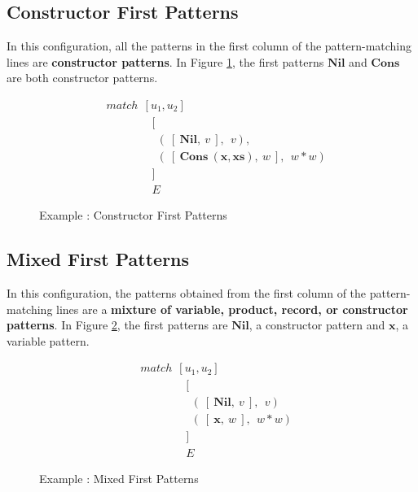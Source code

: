 \documentclass[11pt]{article}
\begin{document}
\subsection{Constructor First Patterns}
  In this configuration, all the patterns in the first column of the pattern-matching lines are {\bf constructor patterns}. In Figure \ref {fig:Pmatch_AllCons}, the first patterns $\mathbf{Nil}$ and $\mathbf{Cons}$ are both constructor patterns.    
    \begin{figure}[!h]
    \begin{align*} 
    &match~~[u_1,u_2] \\
    &\qquad\qquad [\\
    &\qquad\qquad ~~(~[~\mathbf{Nil},~v~],~~v), \\
    &\qquad\qquad ~~(~[~\mathbf{Cons~(x,xs)},~w~],~~w*w) \\
    &\qquad\qquad ]\\
    &\qquad\qquad E
    \end{align*} 
    \caption{Example : Constructor First Patterns} \label{fig:Pmatch_AllCons}
    \end{figure}

\subsection{Mixed First Patterns}
  In this configuration, the patterns obtained from the first column of the pattern-matching lines are a {\bf mixture of variable, product, record, or constructor patterns}. In Figure \ref {fig:Pmatch_MixedPatt}, the first patterns are $\mathbf{Nil}$, a constructor pattern and $\mathbf{x}$, a variable pattern. 

    \begin{figure}[!h]
    \begin{align*} 
    &match~~[u_1,u_2] \\
    &\qquad\qquad [\\
    &\qquad\qquad ~~(~[~\mathbf{Nil},~v~],~~v) \\
    &\qquad\qquad ~~(~[~\mathbf{x},~w~],~~w*w) \\
    &\qquad\qquad ]\\
    &\qquad\qquad E
    \end{align*} 
    \caption{Example : Mixed First Patterns} \label{fig:Pmatch_MixedPatt}
    \end{figure}
\end{document}
